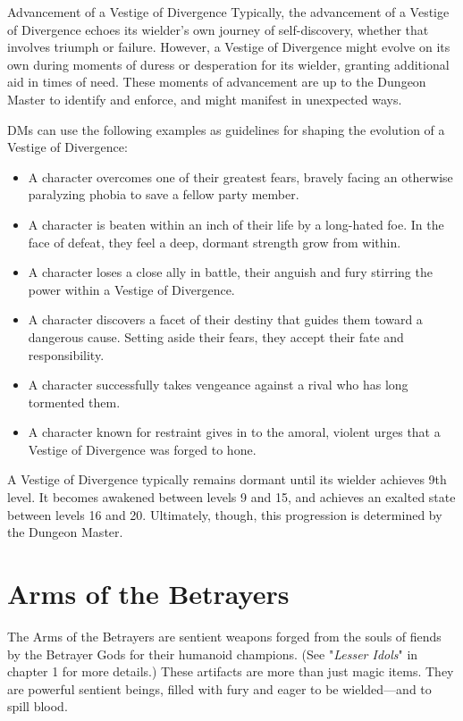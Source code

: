 \documentclass[10pt,a4paper,twoside,bg=print,twocolumn,openany,nodeprecatedcode]{dndbook}
\begin{document}
\begin{DndSidebar}[float=!b]{Advancement of a Vestige of Divergence}
Typically, the advancement of a Vestige of Divergence echoes its wielder's own journey of self-discovery, whether that involves triumph or failure. However, a Vestige of Divergence might evolve on its own during moments of duress or desperation for its wielder, granting additional aid in times of need. These moments of advancement are up to the Dungeon Master to identify and enforce, and might manifest in unexpected ways.



DMs can use the following examples as guidelines for shaping the evolution of a Vestige of Divergence:




\begin{itemize}
\item A character overcomes one of their greatest fears, bravely facing an otherwise paralyzing phobia to save a fellow party member.
\item A character is beaten within an inch of their life by a long-hated foe. In the face of defeat, they feel a deep, dormant strength grow from within.
\item A character loses a close ally in battle, their anguish and fury stirring the power within a Vestige of Divergence.
\item A character discovers a facet of their destiny that guides them toward a dangerous cause. Setting aside their fears, they accept their fate and responsibility.
\item A character successfully takes vengeance against a rival who has long tormented them.
\item A character known for restraint gives in to the amoral, violent urges that a Vestige of Divergence was forged to hone.
\end{itemize}



A Vestige of Divergence typically remains dormant until its wielder achieves 9th level. It becomes awakened between levels 9 and 15, and achieves an exalted state between levels 16 and 20. Ultimately, though, this progression is determined by the Dungeon Master.



\end{DndSidebar}

\section{Arms of the Betrayers}
The Arms of the Betrayers are sentient weapons forged from the souls of fiends by the Betrayer Gods for their humanoid champions. (See "\textit{Lesser Idols}" in chapter 1 for more details.) These artifacts are more than just magic items. They are powerful sentient beings, filled with fury and eager to be wielded—and to spill blood.
\end{document}
